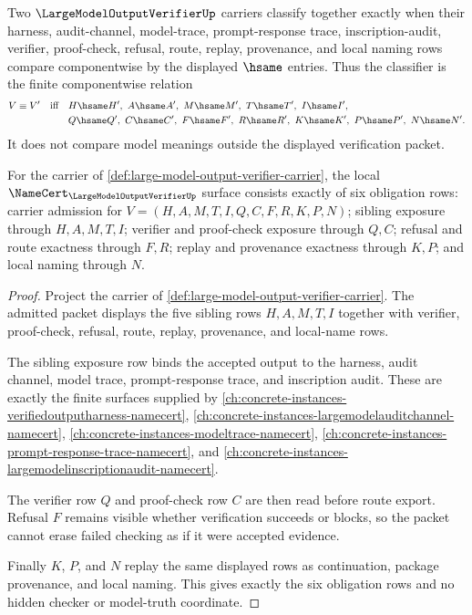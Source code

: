 \begin{definition}
\label{def:large-model-output-verifier-classifier}
Two $\LargeModelOutputVerifierUp$ carriers classify together exactly when their harness, audit-channel, model-trace, prompt-response trace, inscription-audit, verifier, proof-check, refusal, route, replay, provenance, and local naming rows compare componentwise by the displayed $\hsame$ entries. Thus the classifier is the finite componentwise relation
$$
\begin{aligned}
V \equiv V'
\quad\text{iff}\quad&
H \hsame H',\ A \hsame A',\ M \hsame M',\ T \hsame T',\ I \hsame I',\\
&Q \hsame Q',\ C \hsame C',\ F \hsame F',\ R \hsame R',\ K \hsame K',\ P \hsame P',\ N \hsame N'.
\end{aligned}
$$
It does not compare model meanings outside the displayed verification packet.
\end{definition}

\begin{theorem}
\label{thm:large-model-output-verifier-namecert-obligations}
For the carrier of \autoref{def:large-model-output-verifier-carrier}, the local $\NameCert_{\LargeModelOutputVerifierUp}$ surface consists exactly of six obligation rows: carrier admission for $V=(H,A,M,T,I,Q,C,F,R,K,P,N)$; sibling exposure through $H,A,M,T,I$; verifier and proof-check exposure through $Q,C$; refusal and route exactness through $F,R$; replay and provenance exactness through $K,P$; and local naming through $N$.
\end{theorem}
\begin{proof}
Project the carrier of \autoref{def:large-model-output-verifier-carrier}. The admitted packet displays the five sibling rows $H,A,M,T,I$ together with verifier, proof-check, refusal, route, replay, provenance, and local-name rows.

The sibling exposure row binds the accepted output to the harness, audit channel, model trace, prompt-response trace, and inscription audit. These are exactly the finite surfaces supplied by \autoref{ch:concrete-instances-verifiedoutputharness-namecert}, \autoref{ch:concrete-instances-largemodelauditchannel-namecert}, \autoref{ch:concrete-instances-modeltrace-namecert}, \autoref{ch:concrete-instances-prompt-response-trace-namecert}, and \autoref{ch:concrete-instances-largemodelinscriptionaudit-namecert}.

The verifier row $Q$ and proof-check row $C$ are then read before route export. Refusal $F$ remains visible whether verification succeeds or blocks, so the packet cannot erase failed checking as if it were accepted evidence.

Finally $K$, $P$, and $N$ replay the same displayed rows as continuation, package provenance, and local naming. This gives exactly the six obligation rows and no hidden checker or model-truth coordinate.
\end{proof}

